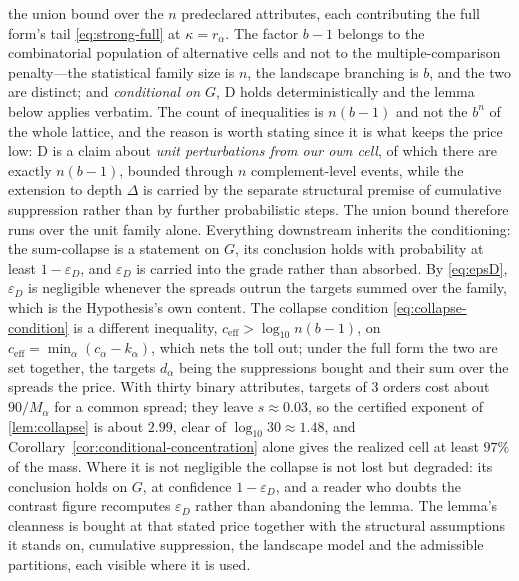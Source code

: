 \documentclass[11pt]{article}
\theoremstyle{definition}
\begin{document}
the union bound over the $n$ predeclared attributes, each contributing the full form's tail \eqref{eq:strong-full} at $\kappa = r_\alpha$. The factor $b-1$ belongs to the combinatorial population of alternative cells and not to the multiple-comparison penalty---the statistical family size is $n$, the landscape branching is $b$, and the two are distinct; and \emph{conditional on $G$}, D holds deterministically and the lemma below applies verbatim. The count of inequalities is $n(b-1)$ and not the $b^{n}$ of the whole lattice, and the reason is worth stating since it is what keeps the price low: D is a claim about \emph{unit perturbations from our own cell}, of which there are exactly $n(b-1)$, bounded through $n$ complement-level events, while the extension to depth $\Delta$ is carried by the separate structural premise of cumulative suppression rather than by further probabilistic steps. The union bound therefore runs over the unit family alone. Everything downstream inherits the conditioning: the sum-collapse is a statement on $G$, its conclusion holds with probability at least $1 - \varepsilon_D$, and $\varepsilon_D$ is carried into the grade rather than absorbed. By \eqref{eq:epsD}, $\varepsilon_D$ is negligible whenever the spreads outrun the targets summed over the family, which is the Hypothesis's own content. The collapse condition \eqref{eq:collapse-condition} is a different inequality, $c_{\mathrm{eff}} > \log_{10} n(b-1)$, on $c_{\mathrm{eff}} = \min_\alpha (c_\alpha - k_\alpha)$, which nets the toll out; under the full form the two are set together, the targets $d_\alpha$ being the suppressions bought and their sum over the spreads the price. With thirty binary attributes, targets of $3$ orders cost about $90/M_\alpha$ for a common spread; they leave $s \approx 0.03$, so the certified exponent of \autoref{lem:collapse} is about $2.99$, clear of $\log_{10} 30 \approx 1.48$, and Corollary~\ref{cor:conditional-concentration} alone gives the realized cell at least $97\%$ of the mass. Where it is not negligible the collapse is not lost but degraded: its conclusion holds on $G$, at confidence $1-\varepsilon_D$, and a reader who doubts the contrast figure recomputes $\varepsilon_D$ rather than abandoning the lemma. The lemma's cleanness is bought at that stated price together with the structural assumptions it stands on, cumulative suppression, the landscape model and the admissible partitions, each visible where it is used. 
\end{document}
